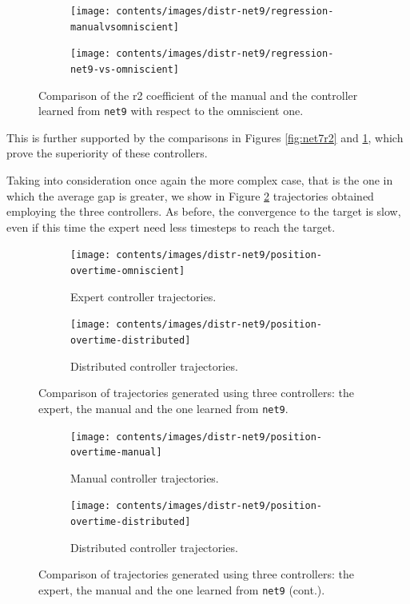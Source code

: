 \begin{figure}[!htb]
	\centering
	\begin{subfigure}[h]{0.49\textwidth}
		\centering
		\texttt{[image: contents/images/distr-net9/regression-manualvsomniscient]}%
	\end{subfigure}
	\hfill
	\begin{subfigure}[h]{0.49\textwidth}
		\centering
		\texttt{[image: contents/images/distr-net9/regression-net9-vs-omniscient]}
	\end{subfigure}
	\caption[Evaluation of the \gls{r2} coefficient of \texttt{net9} .]{Comparison of 
		the \gls{r2} coefficient of the manual and the controller 
		learned from \texttt{net9} with respect to the omniscient one.}
	\label{fig:net9r2}
\end{figure}
This is further supported by the comparisons in Figures \ref{fig:net7r2} and 
\ref{fig:net9r2}, which prove the superiority of these controllers.

Taking into consideration once again the more complex case, that is the one in 
which the average gap is greater, we show in Figure \ref{fig:net9traj} trajectories 
obtained employing the three controllers. 
As before, the convergence to the target is slow, even if this time the expert need 
less timesteps to reach the target.

\begin{figure}[!htb]
	\begin{center}
		\begin{subfigure}[h]{0.49\textwidth}
			\centering
			\texttt{[image: contents/images/distr-net9/position-overtime-omniscient]}%
			\caption{Expert controller trajectories.}
		\end{subfigure}
		\hfill
		\begin{subfigure}[h]{0.49\textwidth}
			\centering
			\texttt{[image: contents/images/distr-net9/position-overtime-distributed]}
			\caption{Distributed controller trajectories.}
		\end{subfigure}
	\end{center}
	\caption[Evaluation of the trajectories learned by 
	\texttt{net9}.]{Comparison of trajectories generated using three 
		controllers: the expert, the manual and the one learned from \texttt{net9}.}
\end{figure}
\medskip
\begin{figure}[!htb]\ContinuedFloat
	\centering
	\begin{subfigure}[h]{0.49\textwidth}
		\centering
		\texttt{[image: contents/images/distr-net9/position-overtime-manual]}%
		\caption{Manual controller trajectories.}
	\end{subfigure}
	\hfill
	\begin{subfigure}[h]{0.49\textwidth}
		\centering
		\texttt{[image: contents/images/distr-net9/position-overtime-distributed]}
		\caption{Distributed controller trajectories.}
	\end{subfigure}
	\caption[]{Comparison 
		of trajectories generated using three controllers: the expert, the manual 
		and the one learned from \texttt{net9} (cont.).}
	\label{fig:net9traj}
\end{figure}

